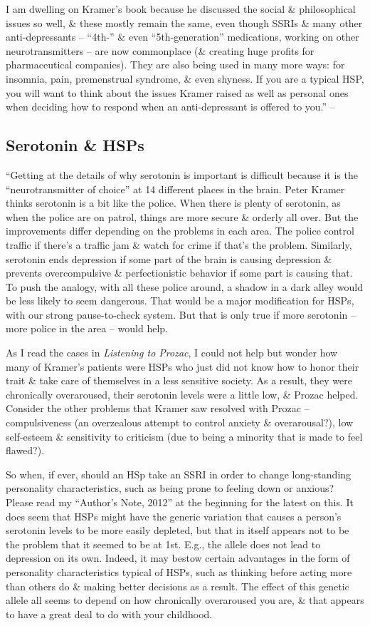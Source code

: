 \documentclass{article}
\numberwithin{equation}{section}
\begin{document}
I am dwelling on Kramer's book because he discussed the social \& philosophical issues so well, \& these mostly remain the same, even though SSRIs \& many other anti-depressants -- ``4th-'' \& even ``5th-generation'' medications, working on other neurotransmitters -- are now commonplace (\& creating huge profits for pharmaceutical companies). They are also being used in many more ways: for insomnia, pain, premenstrual syndrome, \& even shyness. If you are a typical HSP, you will want to think about the issues Kramer raised as well as personal ones when deciding how to respond when an anti-depressant is offered to you.'' -- \cite[p. 231--232]{Aron2013}

\subsection{Serotonin \& HSPs}
``Getting at the details of why serotonin is important is difficult because it is the ``neurotransmitter of choice'' at 14 different places in the brain. Peter Kramer thinks serotonin is a bit like the police. When there is plenty of serotonin, as when the police are on patrol, things are more secure \& orderly all over. But the improvements differ depending on the problems in each area. The police control traffic if there's a traffic jam \& watch for crime if that's the problem. Similarly, serotonin ends depression if some part of the brain is causing depression \& prevents overcompulsive \& perfectionistic behavior if some part is causing that. To push the analogy, with all these police around, a shadow in a dark alley would be less likely to seem dangerous. That would be a major modification for HSPs, with our strong pause-to-check system. But that is only true if more serotonin -- more police in the area -- would help.

As I read the cases in \textit{Listening to Prozac}, I could not help but wonder how many of Kramer's patients were HSPs who just did not know how to honor their trait \& take care of themselves in a less sensitive society. As a result, they were chronically overaroused, their serotonin levels were a little low, \& Prozac helped. Consider the other problems that Kramer saw resolved with Prozac -- compulsiveness (an overzealous attempt to control anxiety \& overarousal?), low self-esteem \& sensitivity to criticism (due to being a minority that is made to feel flawed?).

So when, if ever, should an HSp take an SSRI in order to change long-standing personality characteristics, such as being prone to feeling down or anxious? Please read my ``Author's Note, 2012'' at the beginning for the latest on this. It does seem that HSPs might have the generic variation that causes a person's serotonin levels to be more easily depleted, but that in itself appears not to be the problem that it seemed to be at 1st. E.g., the allele does not lead to depression on its own. Indeed, it may bestow certain advantages in the form of personality characteristics typical of HSPs, such as thinking before acting more than others do \& making better decisions as a result. The effect of this genetic allele all seems to depend on how chronically overaroused you are, \& that appears to have a great deal to do with your childhood.
\end{document}
